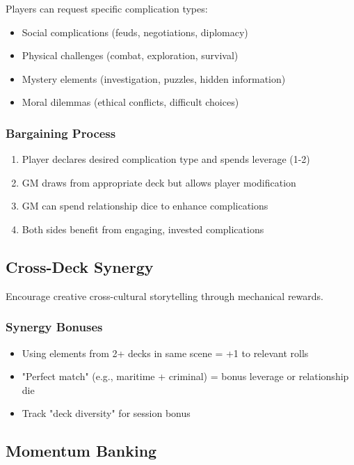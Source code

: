 \begin{description}
Players can request specific complication types:
\begin{itemize}
\item Social complications (feuds, negotiations, diplomacy)
\item Physical challenges (combat, exploration, survival)
\item Mystery elements (investigation, puzzles, hidden information)
\item Moral dilemmas (ethical conflicts, difficult choices)
\end{itemize}

\subsubsection{Bargaining Process}

\begin{enumerate}
\item Player declares desired complication type and spends leverage (1-2)
\item GM draws from appropriate deck but allows player modification
\item GM can spend relationship dice to enhance complications
\item Both sides benefit from engaging, invested complications
\end{enumerate}

\subsection{Cross-Deck Synergy}

Encourage creative cross-cultural storytelling through mechanical rewards.

\subsubsection{Synergy Bonuses}

\begin{itemize}
\item Using elements from 2+ decks in same scene = +1 to relevant rolls
\item "Perfect match" (e.g., maritime + criminal) = bonus leverage or relationship die
\item Track "deck diversity" for session bonus
\end{itemize}

\subsection{Momentum Banking}


\end{description}
